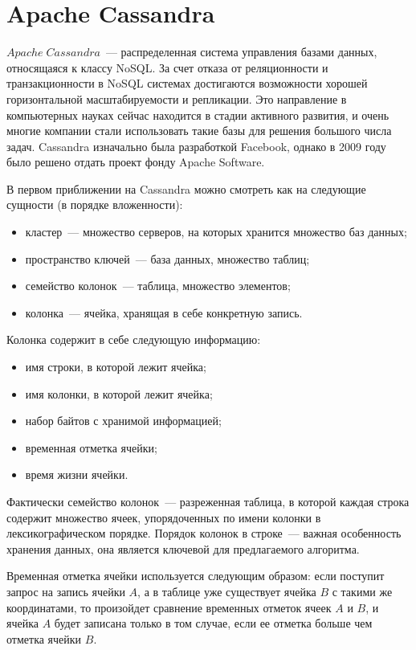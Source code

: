 \section{Apache Cassandra}

$Apache\;Cassandra$~--- распределенная система управления базами данных, относящаяся к классу NoSQL. За счет отказа от реляционности и транзакционности в NoSQL системах достигаются возможности хорошей горизонтальной масштабируемости и репликации. Это направление в компьютерных науках сейчас находится в стадии активного развития, и очень многие компании стали использовать такие базы для решения большого числа задач. Cassandra изначально была разработкой Facebook, однако в 2009 году было решено отдать проект фонду Apache Software.

В первом приближении на Cassandra можно смотреть как на следующие сущности (в порядке вложенности):

\begin{itemize}
	\item кластер~--- множество серверов, на которых хранится множество баз данных;
	\item пространство ключей~--- база данных, множество таблиц;
	\item семейство колонок~--- таблица, множество элементов;
	\item колонка~--- ячейка, хранящая в себе конкретную запись.
\end{itemize}

Колонка содержит в себе следующую информацию:

\begin{itemize}
	\item имя строки, в которой лежит ячейка;
	\item имя колонки, в которой лежит ячейка;
	\item набор байтов с хранимой информацией;
	\item временная отметка ячейки;
	\item время жизни ячейки.
\end{itemize}

Фактически семейство колонок~--- разреженная таблица, в которой каждая строка содержит множество ячеек, упорядоченных по имени колонки в лексикографическом порядке. Порядок колонок в строке~--- важная особенность хранения данных, она является ключевой для предлагаемого алгоритма.

Временная отметка ячейки используется следующим образом: если поступит запрос на запись ячейки $A$, а в таблице уже существует ячейка $B$ с такими же координатами, то произойдет сравнение временных отметок ячеек $A$ и $B$, и ячейка $A$ будет записана только в том случае, если ее отметка больше чем отметка ячейки $B$.


